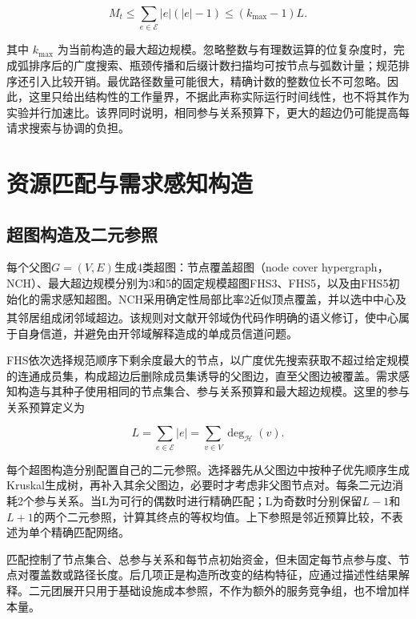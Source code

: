 \documentclass[UTF8,a4paper,twocolumn,fontset=none,zihao=5]{ctexart}
\newcommand{\upcite}[1]{\textsuperscript{\cite{#1}}}
\begin{document}
\begin{equation}
M_t\leq\sum_{e\in\mathcal E}|e|(|e|-1)\leq(k_{\max}-1)L.
\label{eq:7}\end{equation}


其中 $k_{\max}$ 为当前构造的最大超边规模。忽略整数与有理数运算的位复杂度时，完成弧排序后的广度搜索、瓶颈传播和后缀计数扫描均可按节点与弧数计量；规范排序还引入比较开销。最优路径数量可能很大，精确计数的整数位长不可忽略。因此，这里只给出结构性的工作量界，不据此声称实际运行时间线性，也不将其作为实验并行加速比。该界同时说明，相同参与关系预算下，更大的超边仍可能提高每请求搜索与协调的负担。


\section{资源匹配与需求感知构造}

\subsection{超图构造及二元参照}

每个父图$G=(V,E)$生成4类超图：节点覆盖超图（node cover hypergraph，NCH）、最大超边规模分别为3和5的固定规模超图FHS3、FHS5，以及由FHS5初始化的需求感知超图。NCH采用确定性局部比率2近似顶点覆盖，并以选中中心及其邻居组成闭邻域超边。该规则对文献\upcite{r10}开邻域伪代码作明确的语义修订，使中心属于自身信道，并避免由开邻域解释造成的单成员信道问题。


FHS依次选择规范顺序下剩余度最大的节点，以广度优先搜索获取不超过给定规模的连通成员集，构成超边后删除成员集诱导的父图边，直至父图边被覆盖。需求感知构造与其种子使用相同的节点集合、参与关系预算和最大超边规模。这里的参与关系预算定义为



\begin{equation}
L=\sum_{e\in\mathcal E}|e|=\sum_{v\in V}\deg_{\mathcal H}(v).
\label{eq:8}\end{equation}


每个超图构造分别配置自己的二元参照。选择器先从父图边中按种子优先顺序生成Kruskal生成树，再补入其余父图边，必要时才考虑非父图节点对。每条二元边消耗2个参与关系。当L为可行的偶数时进行精确匹配；L为奇数时分别保留$L-1$和$L+1$的两个二元参照，计算其终点的等权均值。上下参照是邻近预算比较，不表述为单个精确匹配网络。


匹配控制了节点集合、总参与关系和每节点初始资金，但未固定每节点参与度、节点对覆盖数或路径长度。后几项正是构造所改变的结构特征，应通过描述性结果解释。二元团展开只用于基础设施成本参照，不作为额外的服务竞争组，也不增加样本量。
\end{document}
